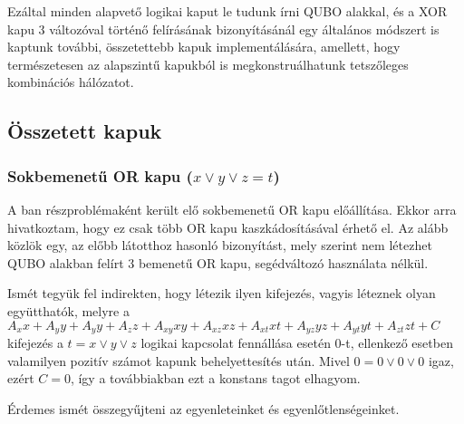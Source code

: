 Ezáltal minden alapvető logikai kaput le tudunk írni QUBO alakkal, és a XOR kapu 3 változóval történő felírásának bizonyításánál egy általános módszert is kaptunk további, összetettebb kapuk implementálására, amellett, hogy természetesen az alapszintű kapukból is megkonstruálhatunk tetszőleges kombinációs hálózatot.

\subsection{Összetett kapuk}

\subsubsection{Sokbemenetű OR kapu ($x \vee y \vee z = t$)} \label{sec:MORgate}

A ban részproblémaként került elő sokbemenetű OR kapu előállítása. Ekkor arra hivatkoztam, hogy ez csak több OR kapu kaszkádosításával érhető el. Az alább közlök egy, az előbb látotthoz hasonló bizonyítást, mely szerint nem létezhet QUBO alakban felírt 3 bemenetű OR kapu, segédváltozó használata nélkül.

Ismét tegyük fel indirekten, hogy létezik ilyen kifejezés, vagyis léteznek olyan együtthatók, melyre a $A_{x}x+A_{y}y+A_{y}y+A_{z}z+ A_{xy}xy+A_{xz}xz+A_{xt}xt+ A_{yz}yz+A_{yt}yt+A_{zt}zt+C$ kifejezés a $t=x \vee y \vee z$ logikai kapcsolat fennállása esetén $0$-t, ellenkező esetben valamilyen pozitív számot kapunk behelyettesítés után.
Mivel $0=0 \vee 0 \vee 0$ igaz, ezért $C=0$, így a továbbiakban ezt a konstans tagot elhagyom.

Érdemes ismét összegyűjteni az egyenleteinket és egyenlőtlenségeinket.


